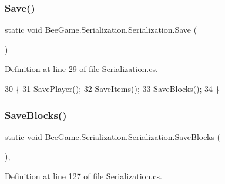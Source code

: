 \subsubsection{\texorpdfstring{Save()}{Save()}}
{\footnotesize\ttfamily static void Bee\+Game.\+Serialization.\+Serialization.\+Save (\begin{DoxyParamCaption}{ }\end{DoxyParamCaption})\hspace{0.3cm}{\ttfamily [static]}}



Definition at line 29 of file Serialization.\+cs.


\begin{DoxyCode}
30         \{
31             \hyperlink{class_bee_game_1_1_serialization_1_1_serialization_a86c4e702114f2f6fdf2dd55517d8e691}{SavePlayer}();
32             \hyperlink{class_bee_game_1_1_serialization_1_1_serialization_a6eef4285def16ce7c5ce67b487e03dd1}{SaveItems}();
33             \hyperlink{class_bee_game_1_1_serialization_1_1_serialization_af90f749946423cc375c37bd7d496691a}{SaveBlocks}();
34         \}
\end{DoxyCode}
\mbox{\label{class_bee_game_1_1_serialization_1_1_serialization_af90f749946423cc375c37bd7d496691a}} 
\subsubsection{\texorpdfstring{Save\+Blocks()}{SaveBlocks()}}
{\footnotesize\ttfamily static void Bee\+Game.\+Serialization.\+Serialization.\+Save\+Blocks (\begin{DoxyParamCaption}{ }\end{DoxyParamCaption})\hspace{0.3cm}{\ttfamily [static]}, {\ttfamily [private]}}



Definition at line 127 of file Serialization.\+cs.


